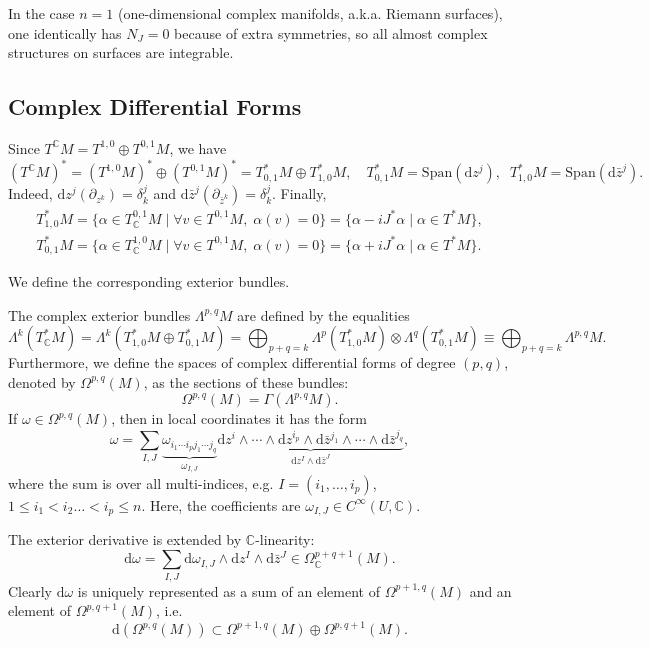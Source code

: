 \documentclass[english,letterpaper]{article}%
\numberwithin{equation}{section}
\numberwithin{figure}{section}
\numberwithin{table}{section}
\theoremstyle{definition}
\theoremstyle{definition}
\theoremstyle{definition}
\theoremstyle{plain}
\theoremstyle{plain}
\theoremstyle{plain}
\theoremstyle{plain}
\theoremstyle{remark}
\theoremstyle{remark}
\newcommand{\dd}{{\mathrm{d}}}
\renewcommand{\leq}{\leqslant}
\begin{document}
\begin{rem}
    In the case $n=1$ (one-dimensional complex manifolds, a.k.a. Riemann surfaces), one identically has $N_J=0$ because of extra symmetries, so all almost complex structures on surfaces are integrable.
\end{rem}


\subsection{Complex Differential Forms}

Since $T^\mathbb{C}M=T^{1,0}\oplus T^{0,1}M$, we have
\[(T^\mathbb{C}M)^\ast=(T^{1,0}M)^\ast \oplus (T^{0,1}M)^\ast=T^\ast_{0,1}M\oplus T^\ast_{1,0}M,\quad T^\ast_{0,1}M=\mathrm{Span}(\dd z^j),\;\; T^\ast_{1,0}M=\mathrm{Span}(\dd\bar z^j). \]
Indeed, $\dd z^j(\partial_{z^k})=\delta^j_k$ and $\dd \bar z^j (\partial_{\bar z^k})=\delta^j_k$.
Finally, 
\begin{align}
    T^\ast_{1,0}M=\{\alpha\in T^{0,1}_{\mathbb{C}}M\mid \forall v\in T^{0,1}M,\; \alpha(v)=0\}=\{\alpha-iJ^\ast\alpha\mid \alpha\in T^\ast M\},\\
    T^\ast_{0,1}M=\{\alpha\in T^{1,0}_{\mathbb{C}}M\mid \forall v\in T^{0,1}M,\; \alpha(v)=0\}=\{\alpha+iJ^\ast\alpha\mid \alpha\in T^\ast M\}.
\end{align}

We define the corresponding exterior bundles.

\begin{defn}
    The complex exterior bundles $\Lambda^{p,q}M$ are defined by the equalities \[\Lambda^k(T^\ast_\mathbb{C}M)=\Lambda^k(T^\ast_{1,0}M\oplus T^\ast_{0,1}M)=\bigoplus_{p+q=k}\Lambda^p(T^\ast_{1,0}M)\otimes \Lambda^q(T^\ast_{0,1}M)\equiv \bigoplus_{p+q=k}\Lambda^{p,q}M.\]
    Furthermore, we define the spaces of complex differential forms of degree $(p,q)$, denoted by $\Omega^{p,q}(M)$, as the sections of these bundles:
    \[\Omega^{p,q}(M)=\Gamma(\Lambda^{p,q}M).\]
    If $\omega\in\Omega^{p,q}(M)$, then in local coordinates it has the form
    \[\omega=\sum_{I,J}\underbrace{\omega_{i_1\cdots i_pj_1\cdots j_q}}_{\omega_{I,J}}\underbrace{\dd z^i\wedge\cdots\wedge \dd z^{i_p}\wedge\dd \bar z^{j_1}\wedge\cdots\wedge \dd\bar z^{j_q}}_{\dd z^I\wedge \dd\bar z^J},\]
    where the sum is over all multi-indices, e.g. $I=(i_1,\ldots,i_p)$, $1\leq i_1<i_2\ldots<i_p\leq n$. Here, the coefficients are $\omega_{I,J}\in C^\infty (U,\mathbb{C})$.
\end{defn}

 The exterior derivative is extended by $\mathbb{C}$-linearity:
    \[\dd \omega=\sum_{I,J}\dd\omega_{I,J}\wedge\dd z^I\wedge\dd \bar z^J\in\Omega^{p+q+1}_\mathbb{C}(M).\]
Clearly $\dd\omega$ is uniquely represented as a sum of an element of $\Omega^{p+1,q}(M)$ and an element of $\Omega^{p,q+1}(M)$, i.e.
\[\dd(\Omega^{p,q}(M))\subset \Omega^{p+1,q}(M)\oplus\Omega^{p,q+1}(M).\]
\end{document}

